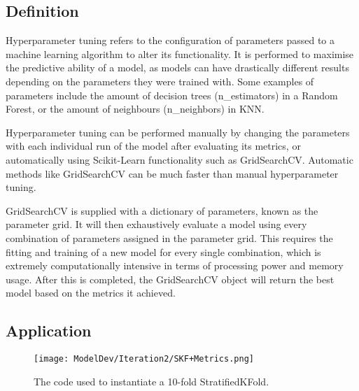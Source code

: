 \subsection{Definition}
Hyperparameter tuning refers to the configuration of parameters passed to a machine learning algorithm to alter its 
functionality. It is performed to maximise the predictive ability of a model, as models can have drastically different 
results depending on the parameters they were trained with. Some examples of parameters include the amount of decision trees 
(n\_estimators) in a Random Forest, or the amount of neighbours (n\_neighbors) in KNN.

\para Hyperparameter tuning can be performed manually by changing the parameters with each individual run of the model after evaluating 
its metrics, or automatically using Scikit-Learn functionality such as GridSearchCV. Automatic methods like GridSearchCV can be much faster than 
manual hyperparameter tuning.

\para GridSearchCV is supplied with a dictionary of parameters, known as the parameter grid. It will then exhaustively evaluate a model
using every combination of parameters assigned in the parameter grid. This requires the fitting and training of a new model for every single 
combination, which is extremely computationally intensive in terms of processing power and memory usage. After this is completed, the GridSearchCV 
object will return the best model based on the metrics it achieved.

\subsection{Application}\label{ASec:HyperparameterApplication}

\begin{figure}[H]
    \centering 
    \texttt{[image: ModelDev/Iteration2/SKF+Metrics.png]}
    \caption{The code used to instantiate a 10-fold StratifiedKFold.}
    \label{fig:SKFCode}
\end{figure}